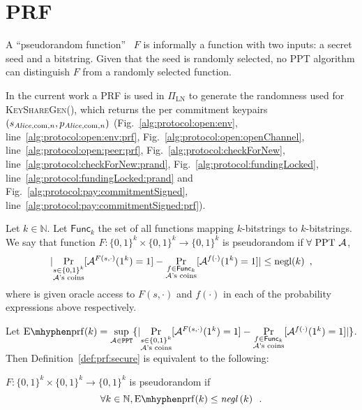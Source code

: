 \section{PRF}
  A ``pseudorandom function''~\cite{katzlindell} $F$ is informally a function
  with two inputs: a secret seed and a bitstring. Given that the seed is
  randomly selected, no PPT algorithm can distinguish $F$ from a randomly
  selected function.

  In the current work a PRF is used in $\Pi_{\mathrm{LN}}$ to generate the
  randomness used for \textsc{KeyShareGen}(), which returns the per commitment
  keypairs $(s_{\mathit{Alice}, \mathrm{com}, n}, p_{\mathit{Alice}, \mathrm{com}, n})$
  (Fig.~\ref{alg:protocol:open:env}, line~\ref{alg:protocol:open:env:prf},
  Fig.~\ref{alg:protocol:open:openChannel},
  line~\ref{alg:protocol:open:peer:prf}, Fig.~\ref{alg:protocol:checkForNew},
  line~\ref{alg:protocol:checkForNew:prand},
  Fig.~\ref{alg:protocol:fundingLocked},
  line~\ref{alg:protocol:fundingLocked:prand} and
  Fig.~\ref{alg:protocol:pay:commitmentSigned},
  line~\ref{alg:protocol:pay:commitmentSigned:prf}).

  \begin{definition}
    \label{def:prf:secure}
    Let $k \in \mathbb{N}$. Let $\mathsf{Func}_k$ the set of all functions
    mapping $k$-bitstrings to $k$-bitstrings. We say that function $F: \{0,
    1\}^k \times \{0, 1\}^k \rightarrow \{0, 1\}^k$ is pseudorandom if $\forall
    \text{ PPT } \mathcal{A}$,
    \begin{equation*}
      |\underset{\substack{s \in \{0, 1\}^k \\ \mathcal{A}\text{'s
      coins}}}{\Pr}[\mathcal{A}^{F(s, \cdot)}(1^k) = 1] - \underset{\substack{f
      \in \mathsf{Func}_k \\ \mathcal{A}\text{'s
      coins}}}{\Pr}[\mathcal{A}^{f(\cdot)}(1^k) = 1]| \leq \text{negl}(k) \enspace,
    \end{equation*}
    where \adversary{} is given oracle access to $F(s, \cdot)$ and $f(\cdot)$ in
    each of the probability expressions above respectively.
  \end{definition}

    Let $\mathrm{E \mhyphen prf}(k) = \underset{\adversary \in
    \mathtt{PPT}}{\sup}\{|\underset{\substack{s \in \{0, 1\}^k \\
    \adversary\text{'s coins}}}{\Pr}[\adversary^{F(s, \cdot)}(1^k) = 1] -
    \underset{\substack{f \in \mathsf{Func}_k \\ \adversary\text{'s
    coins}}}{\Pr}[\adversary^{f(\cdot)}(1^k) = 1]|\}$. Then
    Definition~\ref{def:prf:secure} is equivalent to the following:

    \begin{definition}
      \label{def:prf:secure:sup}
      $F: \{0, 1\}^k \times \{0, 1\}^k \rightarrow \{0, 1\}^k$ is pseudorandom
      if
      \begin{equation*}
        \forall k \in \mathbb{N}, \mathrm{E \mhyphen prf}(k) \leq
        \mathit{negl}\left(k\right) \enspace.
      \end{equation*}
    \end{definition}
